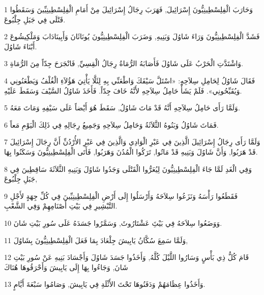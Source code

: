 \par 1 وَحَارَبَ الْفِلِسْطِينِيُّونَ إِسْرَائِيلَ, فَهَرَبَ رِجَالُ إِسْرَائِيلَ مِنْ أَمَامِ الْفِلِسْطِينِيِّينَ وَسَقَطُوا قَتْلَى فِي جَبَلِ جِلْبُوعَ.
\par 2 فَشَدَّ الْفِلِسْطِينِيُّونَ وَرَاءَ شَاوُلَ وَبَنِيهِ, وَضَرَبَ الْفِلِسْطِينِيُّونَ يُونَاثَانَ وَأَبِينَادَابَ وَمَلْكِيشُوعَ أَبْنَاءَ شَاوُلَ.
\par 3 وَاشْتَدَّتِ الْحَرْبُ عَلَى شَاوُلَ فَأَصَابَهُ الرُّمَاةُ رِجَالُ الْقِسِيِّ, فَانْجَرَحَ جِدّاً مِنَ الرُّمَاةِ.
\par 4 فَقَالَ شَاوُلُ لِحَامِلِ سِلاَحِهِ: «اسْتَلَّ سَيْفَكَ وَاطْعَنِّي بِهِ لِئَلَّا يَأْتِيَ هَؤُلاَءِ الْغُلْفُ وَيَطْعَنُونِي وَيُقَبِّحُونِي». فَلَمْ يَشَأْ حَامِلُ سِلاَحِهِ لأَنَّهُ خَافَ جِدّاً. فَأَخَذَ شَاوُلُ السَّيْفَ وَسَقَطَ عَلَيْهِ.
\par 5 وَلَمَّا رَأَى حَامِلُ سِلاَحِهِ أَنَّهُ قَدْ مَاتَ شَاوُلُ, سَقَطَ هُوَ أَيْضاً عَلَى سَيْفِهِ وَمَاتَ مَعَهُ.
\par 6 فَمَاتَ شَاوُلُ وَبَنُوهُ الثَّلاَثَةُ وَحَامِلُ سِلاَحِهِ وَجَمِيعُ رِجَالِهِ فِي ذَلِكَ الْيَوْمِ مَعاً.
\par 7 وَلَمَّا رَأَى رِجَالُ إِسْرَائِيلَ الَّذِينَ فِي عَبْرِ الْوَادِي وَالَّذِينَ فِي عَبْرِ الأُرْدُنِّ أَنَّ رِجَالَ إِسْرَائِيلَ قَدْ هَرَبُوا, وَأَنَّ شَاوُلَ وَبَنِيهِ قَدْ مَاتُوا, تَرَكُوا الْمُدُنَ وَهَرَبُوا, فَأَتَى الْفِلِسْطِينِيُّونَ وَسَكَنُوا بِهَا.
\par 8 وَفِي الْغَدِ لَمَّا جَاءَ الْفِلِسْطِينِيُّونَ لِيُعَرُّوا الْقَتْلَى وَجَدُوا شَاوُلَ وَبَنِيهِ الثَّلاَثَةَ سَاقِطِينَ فِي جَبَلِ جِلْبُوعَ,
\par 9 فَقَطَعُوا رَأْسَهُ وَنَزَعُوا سِلاَحَهُ وَأَرْسَلُوا إِلَى أَرْضِ الْفِلِسْطِينِيِّينَ فِي كُلِّ جِهَةٍ لأَجْلِ التَّبْشِيرِ فِي بَيْتِ أَصْنَامِهِمْ وَفِي الشَّعْبِ.
\par 10 وَوَضَعُوا سِلاَحَهُ فِي بَيْتَِ عَشْتَارُوثَ, وَسَمَّرُوا جَسَدَهُ عَلَى سُورِ بَيْتِ شَانَ.
\par 11 وَلَمَّا سَمِعَ سُكَّانُ يَابِيشَ جِلْعَادَ بِمَا فَعَلَ الْفِلِسْطِينِيُّونَ بِشَاوُلَ,
\par 12 قَامَ كُلُّ ذِي بَأْسٍ وَسَارُوا اللَّيْلَ كُلَّهُ, وَأَخَذُوا جَسَدَ شَاوُلَ وَأَجْسَادَ بَنِيهِ عَنْ سُورِ بَيْتِ شَانَ, وَجَاءُوا بِهَا إِلَى يَابِيشَ وَأَحْرَقُوهَا هُنَاكَ
\par 13 وَأَخَذُوا عِظَامَهُمْ وَدَفَنُوهَا تَحْتَ الأَثْلَةِ فِي يَابِيشَ, وَصَامُوا سَبْعَةَ أَيَّامٍ.

